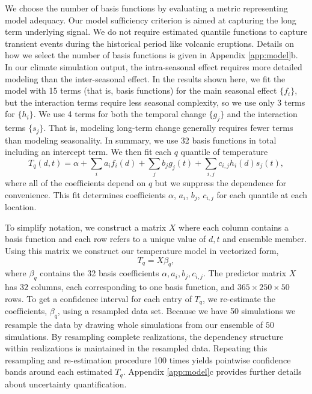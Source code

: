 \documentclass{ametsoc}
\begin{document}
We choose the number of basis functions by evaluating a metric representing model adequacy. Our model sufficiency criterion is aimed at capturing the long term underlying signal. We do not require estimated quantile functions to capture transient events during the historical period like volcanic eruptions. Details on how we select the number of basis functions is given in Appendix \ref{app:model}b. In our climate simulation output, the intra-seasonal effect requires more detailed modeling than the inter-seasonal effect. In the results shown here, we fit the model with 15 terms (that is, basis functions) for the main seasonal effect $\{f_i\}$, but the interaction terms require less seasonal complexity, so we use only 3 terms for $\{h_i\}$.  
We use 4 terms for both the temporal change $\{g_j\}$ and the interaction terms $\{s_j\}$. 
That is, modeling long-term change generally requires fewer terms than modeling seasonality. In summary, we use 32 basis functions in total including an intercept term. We then fit each $q$ quantile of temperature %
\begin{equation}
T_q(d, t) = \alpha + \sum_ia_if_i(d) + \sum_jb_j g_j(t) + \sum_{i,j}c_{i,j} h_i(d)s_j(t),
\end{equation}
 where all of the coefficients depend on $q$ but we suppress the dependence for convenience. This fit determines coefficients $\alpha$, $a_i$, $b_j$, $c_{i,j}$ for each quantile at each location.

To simplify notation, we construct a matrix $X$ where each column contains a basis function and each row refers to a unique value of $d, t$ and ensemble member. Using this matrix we construct our temperature model in vectorized form,
 \begin{equation}
 \label{eq:matrix_version}
 T_q = X\beta_q, 
 \end{equation}
 where $\beta_q$ contains the 32 basis coefficients $\alpha, a_i, b_j, c_{i,j}$. The predictor matrix $X$ has $32$ columns, each corresponding to one basis function, and $365 \times 250 \times 50$ rows. To get a confidence interval for each entry of $T_q$, we re-estimate the coefficients, $\beta_q$, using a resampled data set. Because we have 50 simulations we resample the data by drawing whole simulations from our ensemble of $50$ simulations. By resampling complete realizations, the dependency structure within realizations is maintained in the resampled data. Repeating this resampling and re-estimation procedure 100 times yields pointwise confidence bands around each estimated $T_q$. Appendix \ref{app:model}c provides further details about uncertainty quantification. 
\end{document}
